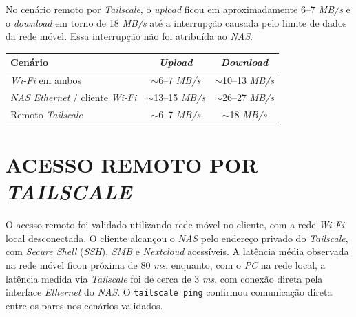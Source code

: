 No cenário remoto por \textit{Tailscale}, o \textit{upload} ficou em aproximadamente 6--7 \textit{MB/s} e o \textit{download} em torno de 18 \textit{MB/s} até a interrupção causada pelo limite de dados da rede móvel. Essa interrupção não foi atribuída ao \textit{NAS}.

\begin{table}[H]
    \centering
    \small
    \renewcommand{\arraystretch}{1.15}
    \begin{tabularx}{\linewidth}{|>{\raggedright\arraybackslash}X|c|c|}
        \hline
        \textbf{Cenário} & \textbf{\textit{Upload}} & \textbf{\textit{Download}} \\
        \hline
        \hline
        \textit{Wi-Fi} em ambos & $\sim$6--7 \textit{MB/s} & $\sim$10--13 \textit{MB/s} \\
        \hline
        \textit{NAS Ethernet} / cliente \textit{Wi-Fi} & $\sim$13--15 \textit{MB/s} & $\sim$26--27 \textit{MB/s} \\
        \hline
        Remoto \textit{Tailscale} & $\sim$6--7 \textit{MB/s} & $\sim$18 \textit{MB/s} \\
        \hline
    \end{tabularx}
    \vspace{0.2cm}
    \fonteautoria
\end{table}

\begin{figure}[H]
    \centering
    \fonteautoria
\end{figure}

\section{ACESSO REMOTO POR \textit{TAILSCALE}}

O acesso remoto foi validado utilizando rede móvel no cliente, com a rede \textit{Wi-Fi} local desconectada. O cliente alcançou o \textit{NAS} pelo endereço privado do \textit{Tailscale}, com \textit{Secure Shell} (\textit{SSH}), \textit{SMB} e \textit{Nextcloud} acessíveis. A latência média observada na rede móvel ficou próxima de 80 \textit{ms}, enquanto, com o \textit{PC} na rede local, a latência medida via \textit{Tailscale} foi de cerca de 3 \textit{ms}, com conexão direta pela interface \textit{Ethernet} do \textit{NAS}. O \texttt{tailscale ping} confirmou comunicação direta entre os pares nos cenários validados.

